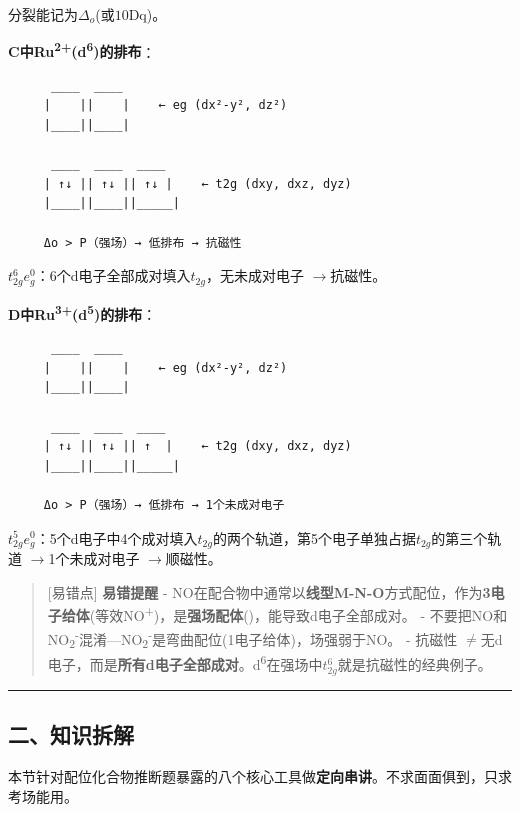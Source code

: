 \documentclass[a4paper,11pt]{ctexart}
\newcommand{\箭}{\ensuremath{\rightarrow}}
\newcommand{\左箭}{\ensuremath{\leftarrow}}
\newcommand{\上箭}{\ensuremath{\uparrow}}
\newcommand{\下箭}{\ensuremath{\downarrow}}
\newcommand{\衡}{\ensuremath{\rightleftharpoons}}
\newcommand{\双箭}{\ensuremath{\leftrightarrow}}
\newcommand{\约等于}{\ensuremath{\approx}}
\newcommand{\小于等于}{\ensuremath{\leq}}
\newcommand{\大于等于}{\ensuremath{\geq}}
\newcommand{\不等于}{\ensuremath{\neq}}
\newcommand{\西格马}{\ensuremath{\sigma}}
\newcommand{\派}{\ensuremath{\pi}}
\begin{document}
分裂能记为\(\Delta_o\)(或\(10\text{Dq}\))。

\textbf{C中Ru\textsuperscript{2+}(d\textsuperscript{6})的排布}：

\begin{verbatim}
      ____  ____
     |    ||    |    ← eg (dx²-y², dz²)
     |____||____|
                    
      ____  ____  ____
     | ↑↓ || ↑↓ || ↑↓ |    ← t2g (dxy, dxz, dyz)
     |____||____||_____|
     
     Δo > P（强场）→ 低排布 → 抗磁性
\end{verbatim}

\(t_{2g}^{6}e_{g}^{0}\)：6个d电子全部成对填入\(t_{2g}\)，无未成对电子 \箭 抗磁性。

\textbf{D中Ru\textsuperscript{3+}(d\textsuperscript{5})的排布}：

\begin{verbatim}
      ____  ____
     |    ||    |    ← eg (dx²-y², dz²)
     |____||____|
                    
      ____  ____  ____
     | ↑↓ || ↑↓ || ↑  |    ← t2g (dxy, dxz, dyz)
     |____||____||_____|     
     
     Δo > P（强场）→ 低排布 → 1个未成对电子
\end{verbatim}

\(t_{2g}^{5}e_{g}^{0}\)：5个d电子中4个成对填入\(t_{2g}\)的两个轨道，第5个电子单独占据\(t_{2g}\)的第三个轨道 \箭 1个未成对电子 \箭 顺磁性。

\begin{quote}
{[}易错点{]} \textbf{易错提醒}
- NO在配合物中通常以\textbf{线型M-N-O}方式配位，作为\textbf{3电子给体}(等效NO\textsuperscript{+})，是\textbf{强场配体}()，能导致d电子全部成对。
- 不要把NO和NO\textsubscript{2}\textsuperscript{-}混淆---NO\textsubscript{2}\textsuperscript{-}是弯曲配位(1电子给体)，场强弱于NO。
- 抗磁性 \不等于 无d电子，而是\textbf{所有d电子全部成对}。d\textsuperscript{6}在强场中\(t_{2g}^{6}\)就是抗磁性的经典例子。
\end{quote}

\begin{center}\rule{0.5\linewidth}{0.5pt}\end{center}

\subsection{二、知识拆解}\label{ux4e8cux77e5ux8bc6ux62c6ux89e3-4}

本节针对配位化合物推断题暴露的八个核心工具做\textbf{定向串讲}。不求面面俱到，只求考场能用。
\end{document}
